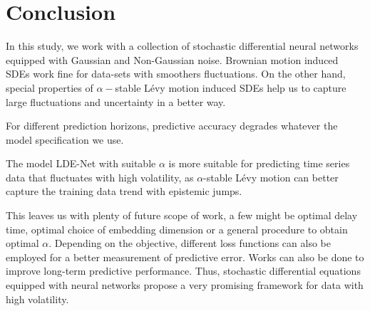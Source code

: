 \section{Conclusion}

In this study, we work with a collection of stochastic differential neural networks equipped with Gaussian and Non-Gaussian noise. Brownian motion induced SDEs work fine for data-sets with smoothers fluctuations. On the other hand, special properties of $\alpha-$stable Lévy motion induced SDEs help us to capture large fluctuations and uncertainty in a better way. 

For different prediction horizons, predictive accuracy degrades whatever the model specification we use. 

The model LDE-Net with suitable $\alpha$ is more suitable for predicting time series data that fluctuates with high volatility, as $\alpha$-stable Lévy motion can better capture the training data trend with epistemic jumps.

This leaves us with plenty of future scope of work, a few might be optimal delay time, optimal choice of embedding dimension or a general procedure to obtain optimal $\alpha$. Depending on the objective, different loss functions can also be employed for a better measurement of predictive error. Works can also be done to improve long-term predictive performance. Thus, stochastic differential equations equipped with neural networks propose a very promising framework for data with high volatility.
\clearpage